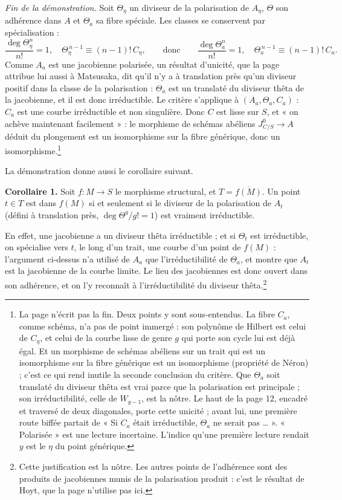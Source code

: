 \documentclass[11pt,a4paper]{article}
\begin{document}
\emph{Fin de la démonstration.} Soit $\Theta_{\eta}$ un diviseur de la
polarisation de $A_{\eta}$, $\Theta$ son adhérence dans $A$ et $\Theta_{a}$ sa
fibre spéciale. Les classes se conservent par spécialisation :
\[
  \frac{\deg \Theta_{\eta}^{n}}{n!} = 1,
  \quad
  \Theta_{\eta}^{\,n-1} \equiv (n-1)!\, C_{\eta},
  \qquad\text{donc}\qquad
  \frac{\deg \Theta_{a}^{n}}{n!} = 1,
  \quad
  \Theta_{a}^{\,n-1} \equiv (n-1)!\, C_{a}.
\]
Comme $A_{a}$ est une jacobienne polarisée, un résultat d'unicité, que la page
attribue lui aussi à Matsusaka, dit qu'il n'y a à translation près qu'un
diviseur positif dans la classe de la polarisation : $\Theta_{a}$ est un
translaté du diviseur thêta de la jacobienne, et il est donc irréductible. Le
critère s'applique à $(A_{a}, \Theta_{a}, C_{a})$ : $C_{a}$ est une courbe
irréductible et non singulière. Donc $C$ est lisse sur $S$, et « on achève
maintenant facilement » : le morphisme de schémas abéliens
$J^{0}_{C/S} \to A$ déduit du plongement est un isomorphisme sur la fibre
générique, donc un isomorphisme.\footnote{La page n'écrit pas la fin. Deux
points y sont sous-entendus. La fibre $C_{a}$, comme schéma, n'a pas de point
immergé : son polynôme de Hilbert est celui de $C_{\eta}$, et celui de la
courbe lisse de genre $g$ qui porte son cycle lui est déjà égal. Et un
morphisme de schémas abéliens sur un trait qui est un isomorphisme sur la
fibre générique est un isomorphisme (propriété de Néron) ; c'est ce qui rend
inutile la seconde conclusion du critère. Que $\Theta_{a}$ soit translaté du
diviseur thêta est vrai parce que la polarisation est principale ; son
irréductibilité, celle de $W_{g-1}$, est la nôtre. Le haut de la page 12,
encadré et traversé de deux diagonales, porte cette unicité ; avant lui, une
première route biffée partait de « Si $C_{a}$ était irréductible, $\Theta_{a}$
ne serait pas … ». « Polarisée » est une lecture incertaine. L'indice qu'une
première lecture rendait $y$ est le $\eta$ du point générique.}

La démonstration donne aussi le corollaire suivant.

\textbf{Corollaire 1.} Soit $f : M \to S$ le morphisme structural, et
$T = \overline{f(M)}$. Un point $t \in T$ est dans $f(M)$ si et seulement si le
diviseur de la polarisation de $A_{t}$ (défini à translation près,
$\deg \Theta^{g}/g! = 1$) est vraiment irréductible.

En effet, une jacobienne a un diviseur thêta irréductible ; et si $\Theta_{t}$
est irréductible, on spécialise vers $t$, le long d'un trait, une courbe d'un
point de $f(M)$ : l'argument ci-dessus n'a utilisé de $A_{a}$ que
l'irréductibilité de $\Theta_{a}$, et montre que $A_{t}$ est la jacobienne de
la courbe limite. Le lieu des jacobiennes est donc ouvert dans son adhérence,
et on l'y reconnaît à l'irréductibilité du diviseur thêta.\footnote{Cette
justification est la nôtre. Les autres points de l'adhérence sont des
produits de jacobiennes munis de la polarisation produit : c'est le résultat
de Hoyt, que la page n'utilise pas ici.}
\end{document}
